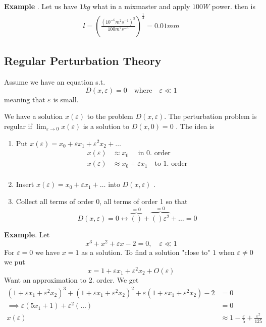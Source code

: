 \documentclass{article}
\theoremstyle{remark}
\newcommand{\newpara}
  {
  \vskip 0.4cm
  }
\begin{document}
\textbf{Example} . Let us have $1 kg$ what in a mixmaster and apply $100W$ power. then is \[
\begin{split}
  l = \left( \frac{\left( 10^{-6} m^2 s ^{-1} \right)^{3}}{100 m^2 s^{-3}}  \right) ^{\frac{1}{4}} =  0.01mm
\end{split} 
\] 

\newpage
\subsection{Regular Perturbation Theory }%
\label{sec:regular_perturbation_theory_}

Assume we have an equation s.t. \[
D\left( x, \varepsilon  \right) = 0 \quad \text{where} \quad \varepsilon \ll 1  
\] 
meaning that $\varepsilon $ is small. 

\newpara
We have a solution $x\left( \varepsilon  \right)   $ to the problem $D\left( x, \varepsilon  \right)$. The perturbation problem is regular if $\lim_{\varepsilon \to 0} x\left( \varepsilon  \right)$ is a solution to $D\left( x, 0 \right) = 0$ . The idea is 
\begin{enumerate}
  \item Put $x\left( \varepsilon  \right) = x_{0} + \varepsilon  x_{1} + \varepsilon ^2 x_{2} + \ldots$ \[
  \begin{split}
    x\left( \varepsilon  \right)  & \approx x_{0} \quad \text{ in 0. order}   \\
    x\left( \varepsilon  \right)  & \approx x_{0}  +  \varepsilon x_{1 } \quad \text{to 1. order}  \\
  \end{split} 
  \] 
\item Insert $ x\left( \varepsilon  \right) = x_{0} + \varepsilon x_{1} + \ldots$ into $D\left(x, \varepsilon  \right)$ . 
\item  Collect all terms of order 0, all terms of order 1 so that \[
D\left( x, \varepsilon  \right) = 0 \leftrightarrow  \overbrace{\left( \right)}^{= 0}  + \overbrace{\left(  \right) \varepsilon ^2} ^{ = 0} + \ldots = 0 
\] 
\end{enumerate}

\textbf{Example}. Let \[
x^3 + x^2 + \varepsilon x - 2 = 0 , \quad  \varepsilon  \ll  1 
\] 
For $\varepsilon  = 0$ we have $x =1 $ as a solution. To find a solution "close to" $1$ when $\varepsilon  \neq 0$ we put \[
x = 1 + \varepsilon  x_{1} + \varepsilon ^2 x_{2} + O\left( \varepsilon  \right)
\] 
Want an approximation to 2. order. We get \[
  \begin{split}
\left( 1 + \varepsilon  x_{1} + \varepsilon ^2 x_{2}  \right)^{3} + \left( 1 + \varepsilon x_{1} + \varepsilon ^2 x_{2} \right)^{2} + \varepsilon \left( 1 + \varepsilon  x_{1} + \varepsilon ^2 x_{2} \right)  -2  & = 0 \\
\implies  \varepsilon \left( 5x_{1} +1 \right) + \varepsilon ^2 \left( \ldots \right) &=  0 \\
x\left( \varepsilon  \right)   &  \approx 1  - \frac{\varepsilon }{5} + \frac{\varepsilon ^2}{ 125}  
  \end{split} 
\] 
\end{document}
